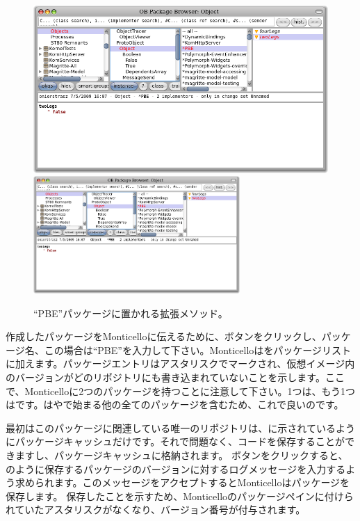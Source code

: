 \documentclass[a4paper,10pt,twoside]{book}
\begin{document}
\begin{figure}[btp]
\begin{center}
\ifluluelse
{\includegraphics[width=\textwidth]{MCnewmethod}}
{\includegraphics[width=0.7\textwidth]{MCnewmethod}}
\end{center}
\caption{``PBE''パッケージに置かれる拡張メソッド。}
\end{figure}

作成したパッケージをMonticelloに伝えるために、ボタンをクリックし、パッケージ名、この場合は``PBE''を入力して下さい。Monticelloはをパッケージリストに加えます。パッケージエントリはアスタリスクでマークされ、仮想イメージ内のバージョンがどのリポジトリにも書き込まれていないことを示します。ここで、Monticelloに2つのパッケージを持つことに注意して下さい。1つは、もう1つはです。はやで始まる他の全てのパッケージを含むため、これで良いのです。

最初はこのパッケージに関連している唯一のリポジトリは、に示されているようにパッケージキャッシュだけです。それで問題なく、コードを保存することができますし、パッケージキャッシュに格納されます。
ボタンをクリックすると、のように保存するパッケージのバージョンに対するログメッセージを入力するよう求められます。このメッセージをアクセプトするとMonticelloはパッケージを保存します。
保存したことを示すため、Monticelloのパッケージペインに付けられていたアスタリスクがなくなり、バージョン番号が付与されます。
\end{document}
